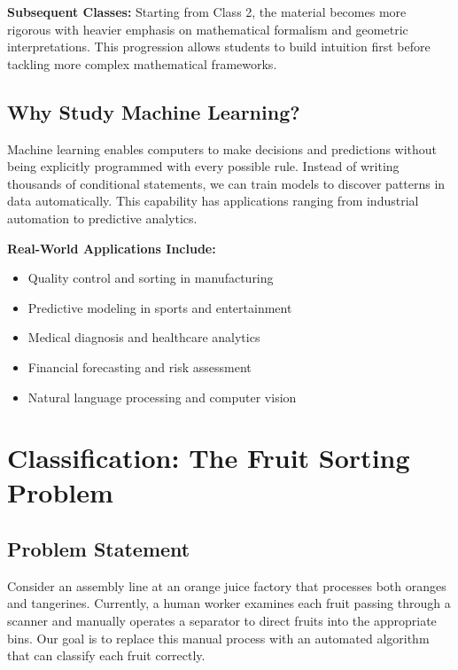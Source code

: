 \documentclass[12pt,a4paper]{article}
\theoremstyle{directpoint}
\theoremstyle{definition}
\begin{document}
\textbf{Subsequent Classes:} Starting from Class 2, the material becomes more rigorous with heavier emphasis on mathematical formalism and geometric interpretations. This progression allows students to build intuition first before tackling more complex mathematical frameworks.

\subsection{Why Study Machine Learning?}

Machine learning enables computers to make decisions and predictions without being explicitly programmed with every possible rule. Instead of writing thousands of conditional statements, we can train models to discover patterns in data automatically. This capability has applications ranging from industrial automation to predictive analytics.

\textbf{Real-World Applications Include:}
\begin{itemize}
    \item Quality control and sorting in manufacturing
    \item Predictive modeling in sports and entertainment
    \item Medical diagnosis and healthcare analytics
    \item Financial forecasting and risk assessment
    \item Natural language processing and computer vision
\end{itemize}

\newpage

\section{Classification: The Fruit Sorting Problem}

\subsection{Problem Statement}

Consider an assembly line at an orange juice factory that processes both oranges and tangerines. Currently, a human worker examines each fruit passing through a scanner and manually operates a separator to direct fruits into the appropriate bins. Our goal is to replace this manual process with an automated algorithm that can classify each fruit correctly.
\end{document}
